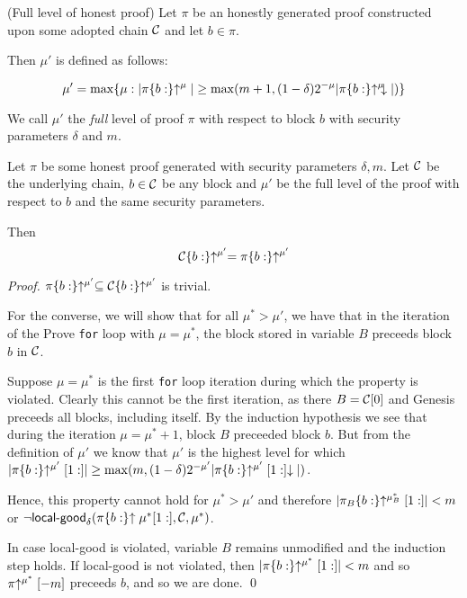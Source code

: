 \begin{definition}{(Full level of honest proof)}
Let $\pi$ be an honestly generated proof constructed upon some adopted chain
$\mathcal{C}$ and let $b \in \pi$.

Then $\mu'$ is defined as follows:


\begin{equation*}
\mu' = \max\{\mu: |\pi\{b:\}\negthickspace\uparrow^\mu| \geq \max(m + 1, (1 -
\delta)2^{-\mu}|\pi\{b:\}\negthickspace\uparrow^\mu\negthickspace\downarrow|)\}
\end{equation*}

We call $\mu'$ the \textit{full} level of proof $\pi$ with respect to
block $b$ with security parameters $\delta$ and $m$.
\end{definition}

\begin{lemma}\label{lem:allblocks}
Let $\pi$ be some honest proof generated with security parameters $\delta, m$.
Let $\mathcal{C}$ be the underlying chain, $b \in \mathcal{C}$ be any block and $\mu'$ be
the full level of the proof with respect to $b$ and the same security
parameters.

Then
\begin{equation*}
\mathcal{C}\{b:\}\negthickspace\uparrow^{\mu'} = \pi\{b:\}\negthickspace\uparrow^{\mu'}
\end{equation*}
\end{lemma}
\begin{proof}
    $\pi\{b:\}\negthickspace\uparrow^{\mu'} \subseteq \mathcal{C}\{b:\}\negthickspace\uparrow^{\mu'}$ is trivial.

    For the converse, we will show that for all $\mu^* > \mu'$, we have that in
    the iteration of the Prove \texttt{for} loop with $\mu = \mu^*$, the block
    stored in variable $B$ preceeds block $b$ in $\mathcal{C}$.

    Suppose $\mu = \mu^*$ is the first \texttt{for} loop iteration during which the
    property is violated. Clearly this cannot be the first iteration, as there
    $B = \mathcal{C}[0]$ and Genesis preceeds all blocks, including itself. By the
    induction hypothesis we see that during the iteration $\mu = \mu^* + 1$,
    block $B$ preceeded block $b$. But from the definition of $\mu'$ we know
    that $\mu'$ is the highest level for which
    $|\pi\{b:\}\negthickspace\uparrow^{\mu'}[1:]|
    \geq \max(m, (1 -
    \delta)2^{-\mu'}|\pi\{b:\}\negthickspace\uparrow^{\mu'}[1:]\negthickspace\downarrow|)$.

    Hence, this
    property cannot hold for $\mu^* > \mu'$ and therefore
    $|\pi_B\{b:\}\negthickspace\uparrow^{\mu_B^*}[1:]| < m$ or $\lnot
    \textsf{local-good}_\delta(\pi\{b:\}\negthickspace\uparrow{\mu^*}[1:], \mathcal{C}, \mu^*)$.

    In case \textsf{local-good} is violated, variable $B$ remains unmodified and
    the induction step holds. If \textsf{local-good} is not violated, then
    $|\pi\{b:\}\negthickspace\uparrow^{\mu^*}[1:]| < m$ and so $\pi\negthickspace\uparrow^{\mu^*}[-m]$
    preceeds $b$, and so we are done.
    \qed
\end{proof}


